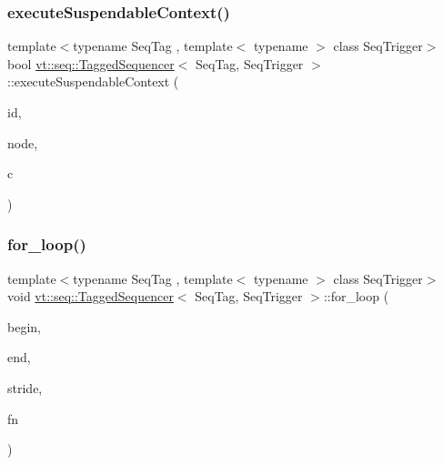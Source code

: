 \subsubsection{\texorpdfstring{execute\+Suspendable\+Context()}{executeSuspendableContext()}}
{\footnotesize\ttfamily template$<$typename Seq\+Tag , template$<$ typename $>$ class Seq\+Trigger$>$ \\
bool \hyperlink{structvt_1_1seq_1_1_tagged_sequencer}{vt\+::seq\+::\+Tagged\+Sequencer}$<$ Seq\+Tag, Seq\+Trigger $>$\+::execute\+Suspendable\+Context (\begin{DoxyParamCaption}\item[{\hyperlink{structvt_1_1seq_1_1_tagged_sequencer_a1c8ee839258d0f88c49ef660267a81d5}{Seq\+Type} const \&}]{id,  }\item[{\hyperlink{namespacevt_1_1seq_ae6a4874b585be0612aaca32ca6d2d191}{Seq\+Node\+Ptr\+Type}}]{node,  }\item[{\hyperlink{structvt_1_1seq_1_1_tagged_sequencer_ad8a1ed9b8c012cf2a73ebd2e46d6d899}{Seq\+Ctx\+Function\+Type}}]{c }\end{DoxyParamCaption})}

\mbox{\label{structvt_1_1seq_1_1_tagged_sequencer_a798c857fbac821760fbdf54cd4515505}} 
\subsubsection{\texorpdfstring{for\+\_\+loop()}{for\_loop()}}
{\footnotesize\ttfamily template$<$typename Seq\+Tag , template$<$ typename $>$ class Seq\+Trigger$>$ \\
void \hyperlink{structvt_1_1seq_1_1_tagged_sequencer}{vt\+::seq\+::\+Tagged\+Sequencer}$<$ Seq\+Tag, Seq\+Trigger $>$\+::for\+\_\+loop (\begin{DoxyParamCaption}\item[{\hyperlink{namespacevt_1_1seq_a6c570c39bac8f93bafe0bf8a0db8c798}{For\+Index} const \&}]{begin,  }\item[{\hyperlink{namespacevt_1_1seq_a6c570c39bac8f93bafe0bf8a0db8c798}{For\+Index} const \&}]{end,  }\item[{\hyperlink{namespacevt_1_1seq_a6c570c39bac8f93bafe0bf8a0db8c798}{For\+Index} const \&}]{stride,  }\item[{\hyperlink{namespacevt_1_1seq_a822a80f3859b6840e7114128a06ac197}{Func\+Index\+Type}}]{fn }\end{DoxyParamCaption})}

